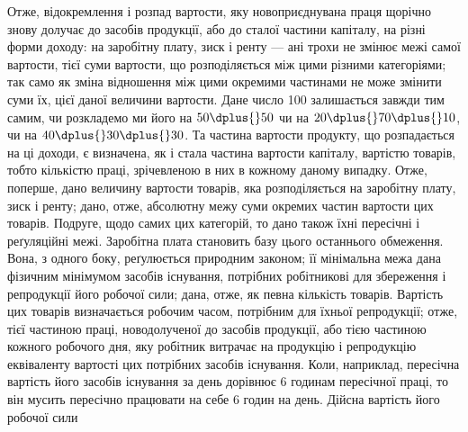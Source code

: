 Отже, відокремлення і розпад вартости, яку новоприєднувана праця щорічно
знову долучає до засобів продукції, або до сталої частини капіталу, на різні форми
доходу: на заробітну плату, зиск і ренту — ані трохи не змінює межі самої вартости,
тієї суми вартости, що розподіляється між цими різними категоріями; так
само як зміна відношення між цими окремими частинами не може змінити суми їх,
цієї даної величини вартости. Дане число 100 залишається завжди тим самим, чи
розкладемо ми його на $50 \dplus{} 50$ чи на $20 \dplus{} 70 \dplus{} 10$, чи на $40 \dplus{} 30 \dplus{} 30$. Та
частина вартости продукту, що розпадається на ці доходи, є визначена, як і стала
частина вартости капіталу, вартістю товарів, тобто кількістю праці, зрічевленою
в них в кожному даному випадку. Отже, поперше, дано величину вартости
товарів, яка розподіляється на заробітну плату, зиск і ренту; дано, отже, абсолютну
межу суми окремих частин вартости цих товарів. Подруге, щодо самих
цих категорій, то дано також їхні пересічні і реґуляційні межі. Заробітна плата
становить базу цього останнього обмеження. Вона, з одного боку, реґулюється
природним законом; її мінімальна межа дана фізичним мінімумом засобів існування,
потрібних робітникові для збереження і репродукції його робочої сили;
дана, отже, як певна кількість товарів. Вартість цих товарів визначається робочим
часом, потрібним для їхньої репродукції; отже, тієї частиною праці, новодолученої
до засобів продукції, або тією частиною кожного робочого дня, яку
робітник витрачає на продукцію і репродукцію еквіваленту вартості цих потрібних
засобів існування. Коли, наприклад, пересічна вартість його засобів
існування за день дорівнює 6 годинам пересічної праці, то він мусить пересічно
працювати на себе 6 годин на день. Дійсна вартість його робочої сили
\parbreak{}  %
